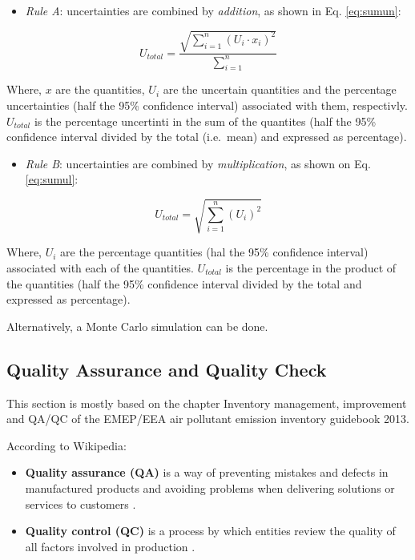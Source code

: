 \documentclass[12pt,graybox,envcountchap,sectrefs]{krantz}
\providecommand{\tightlist}{%
  \setlength{\itemsep}{0pt}\setlength{\parskip}{0pt}}
\theoremstyle{definition}
\theoremstyle{definition}
\theoremstyle{definition}
\theoremstyle{remark}
\begin{document}
\begin{itemize}
\tightlist
\item
  \emph{Rule A}: uncertainties are combined by \emph{addition}, as shown
  in Eq. \eqref{eq:sumun}:
\end{itemize}

\begin{equation}
U_{total}=\frac{\sqrt{\sum_{i = 1}^{n}(U_i \cdot x_i )^2}}{\sum_{i = 1}^{n}}
\label{eq:sumun}
\end{equation}

Where, \(x\) are the quantities, \(U_i\) are the uncertain quantities
and the percentage uncertainties (half the 95\% confidence interval)
associated with them, respectivly. \(U_{total}\) is the percentage
uncertinti in the sum of the quantites (half the 95\% confidence
interval divided by the total (i.e.~mean) and expressed as percentage).

\begin{itemize}
\tightlist
\item
  \emph{Rule B}: uncertainties are combined by \emph{multiplication}, as
  shown on Eq. \eqref{eq:sumul}:
\end{itemize}

\begin{equation}
U_{total}=\sqrt{\sum_{i = 1}^{n}(U_i)^2} 
\label{eq:sumul}
\end{equation}

Where, \(U_i\) are the percentage quantities (hal the 95\% confidence
interval) associated with each of the quantities. \(U_{total}\) is the
percentage in the product of the quantities (half the 95\% confidence
interval divided by the total and expressed as percentage).

Alternatively, a Monte Carlo simulation can be done.

\subsection{Quality Assurance and Quality
Check}\label{quality-assurance-and-quality-check}

This section is mostly based on the chapter Inventory management,
improvement and QA/QC \citep{guiaqa} of the EMEP/EEA air pollutant
emission inventory guidebook 2013.

According to Wikipedia:

\begin{itemize}
\tightlist
\item
  \textbf{Quality assurance (QA)} is a way of preventing mistakes and
  defects in manufactured products and avoiding problems when delivering
  solutions or services to customers \citep{wiki:qa}.
\item
  \textbf{Quality control (QC)} is a process by which entities review
  the quality of all factors involved in production \citep{wiki:qc}.
\end{itemize}
\end{document}
